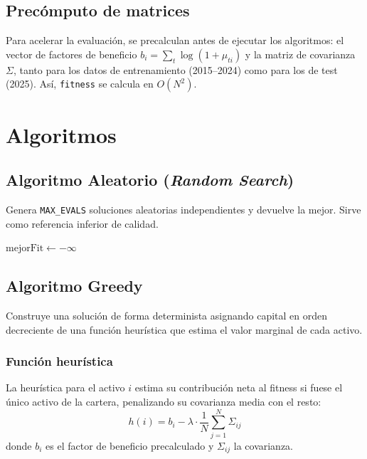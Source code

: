 \documentclass[12pt,a4paper]{article}
\begin{document}
\subsection{Precómputo de matrices}

Para acelerar la evaluación, se precalculan antes de ejecutar los algoritmos:
el vector de factores de beneficio $b_i = \sum_t \log(1+\mu_{ti})$
y la matriz de covarianza $\Sigma$, tanto para los datos de entrenamiento (2015--2024)
como para los de test (2025). Así, \texttt{fitness} se calcula en $O(N^2)$.

\section{Algoritmos}

\subsection{Algoritmo Aleatorio (\textit{Random Search})}

Genera \texttt{MAX\_EVALS} soluciones aleatorias independientes y devuelve la mejor.
Sirve como referencia inferior de calidad.

\begin{algorithm}[H]
\caption{Búsqueda Aleatoria}
$\text{mejorFit} \leftarrow -\infty$\;
\end{algorithm}

\subsection{Algoritmo Greedy}

Construye una solución de forma determinista asignando capital en orden decreciente
de una función heurística que estima el valor marginal de cada activo.

\subsubsection*{Función heurística}

La heurística para el activo $i$ estima su contribución neta al fitness si fuese
el único activo de la cartera, penalizando su covarianza media con el resto:
\[
  h(i) = b_i - \lambda \cdot \frac{1}{N}\sum_{j=1}^{N} \Sigma_{ij}
\]
donde $b_i$ es el factor de beneficio precalculado y $\Sigma_{ij}$ la covarianza.
\end{document}
